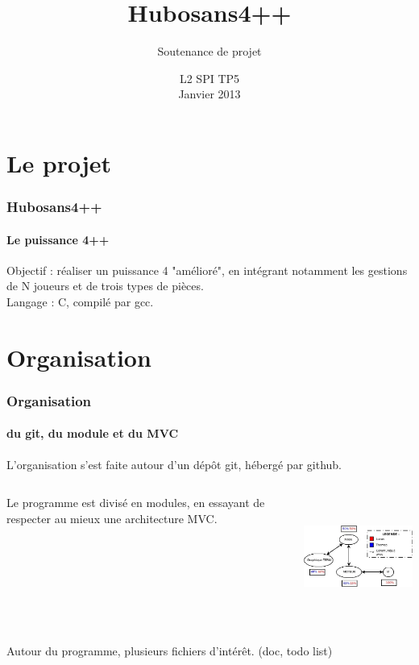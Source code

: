 \documentclass{beamer}
\title{Hubosans4++}
\subtitle{Soutenance de projet}
\author{}
\date{L2 SPI TP5\\ Janvier 2013}
\begin{document}
    \frame{\titlepage}


    \begin{frame}
        \tableofcontents[]
    \end{frame}      



    \section{Le projet}
    \begin{frame}
    \frametitle{Hubosans4++}
    \framesubtitle{Le puissance 4++}
        Objectif : réaliser un puissance 4 "amélioré", 
            en intégrant notamment les gestions de N joueurs 
            et de trois types de pièces. \\     
        \vspace{2cm} %
        Langage : C, compilé par gcc. \\
    \end{frame}



    \section{Organisation}
    \begin{frame}
    \frametitle{Organisation}
    \framesubtitle{du git, du module et du MVC}
        L'organisation s'est faite autour d'un dépôt git, 
            hébergé par github.  
        \vspace{1cm} %
        \begin{columns}[c] %
            \begin{column}{5cm} %
                Le programme est divisé en modules, en essayant 
                    de respecter au mieux une architecture MVC. 
            \end{column}
            \begin{column}{7cm} %
                \includegraphics[width=6cm, height=4cm]{ressources/presentation/archi_projet.jpeg}
            \end{column}
        \end{columns}
        \vspace{1cm} %
        Autour du programme, plusieurs fichiers d'intérêt.
            (doc, todo list)
    \end{frame}
\end{document}
